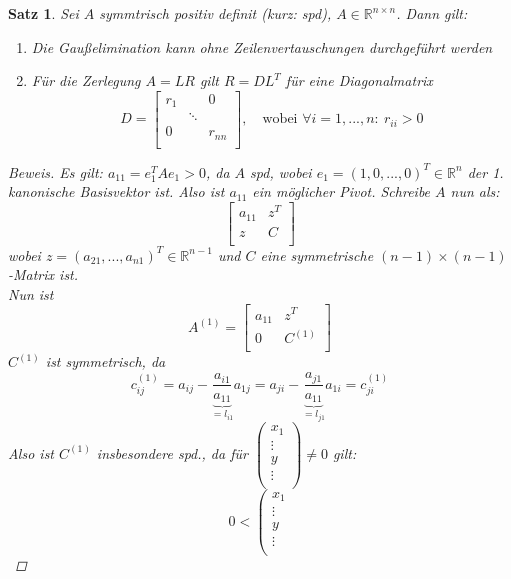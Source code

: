 \documentclass[12pt]{article}
\theoremstyle{break}
\newtheorem{theorem}{Satz}[subsection]
\begin{document}
\begin{theorem}
Sei $A$ symmtrisch positiv definit (kurz: spd), $A \in \mathbb{R}^{n\times n}$. Dann gilt:
\begin{enumerate}
  \item[i)] Die Gaußelimination kann ohne Zeilenvertauschungen durchgeführt werden
  \item[ii)] Für die Zerlegung $A=LR$ gilt $R = DL^T$ für eine Diagonalmatrix 
  $$D =
  \begin{bmatrix}
  r_1 && 0 \\
  & \ddots \\
  0 && r_{nn} \\
  \end{bmatrix}, \quad \text{wobei }\forall i = 1,...,n: \medspace r_{ii} > 0$$ 
\end{enumerate}
\begin{proof}[Beweis]
Es gilt: $a_{11} = e_{1}^T A e_1 > 0$, da $A$ spd, wobei $e_1 = (1,0,...,0)^T \in \mathbb{R}^n$ der 1. kanonische Basisvektor ist. Also ist $a_{11}$ ein möglicher Pivot. Schreibe $A$ nun als:
$$\left[
\begin{array}{c|c}
a_{11} & z^T \\
\hline
z & C \\
\end{array}
\right]$$
wobei $z = (a_{21}, ..., a_{n1})^T \in \mathbb{R}^{n-1}$ und $C$ eine symmetrische $(n-1)\times(n-1)$-Matrix ist. \\
Nun ist 
$$A^{(1)} = \left[
\begin{array}{c|c}
a_{11} & z^T \\
\hline
0 & C^{(1)} \\
\end{array}
\right]$$
$C^{(1)}$ ist symmetrisch, da 
$$c_{ij}^{(1)} = a_{ij} - \underbrace{\frac{a_{i1}}{a_{11}}}_{= l_{i1}} a_{1j} = a_{ji} - \underbrace{\frac{a_{j1}}{a_{11}}}_{= l_{j1}} a_{1i} = c_{ji}^{(1)}$$
Also ist $C^{(1)}$ insbesondere spd., da für 
$\left(
\begin{array}{c}
x_1 \\
\hline
\vdots \\
y \\
\vdots \\
\end{array}
\right) \neq 0 $ gilt:
$$ 0 < 
\left(
\begin{array}{c}
x_1 \\
\hline
\vdots \\
y \\
\vdots \\

\end{array}$$
\end{proof}
\end{theorem}
\end{document}
